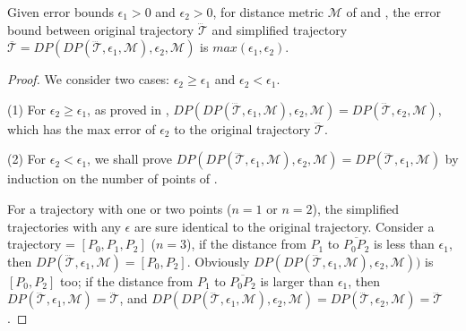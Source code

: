 \begin{proposition}
	\label{theo-aging-error-dp}
	Given error bounds $\epsilon_1>0$ and $\epsilon_2>0$, for distance metric $\mathcal{M}$ of \ped and \sed, the error bound between original trajectory $\dddot{\mathcal{T}}$ and simplified trajectory $\overline{\mathcal{T}}=DP(DP(\dddot{\mathcal{T}}, \epsilon_1, \mathcal{M}), \epsilon_2, \mathcal{M})$ is $max(\epsilon_1, \epsilon_2)$.
\end{proposition}

\begin{proof} We consider two cases: $\epsilon_2 \ge \epsilon_1$ and $\epsilon_2 < \epsilon_1$.

(1) For $\epsilon_2 \ge \epsilon_1$, as proved in \cite{Cao:Spatio}, $DP(DP(\dddot{\mathcal{T}}, \epsilon_1, \mathcal{M}), \epsilon_2, \mathcal{M}) = DP(\dddot{\mathcal{T}}, \epsilon_2, \mathcal{M})$, which has the max error of $\epsilon_2$ to the original trajectory $\dddot{\mathcal{T}}$.
	
(2) For $\epsilon_2 < \epsilon_1$, we shall prove $DP(DP(\dddot{\mathcal{T}}, \epsilon_1, \mathcal{M}), \epsilon_2, \mathcal{M}) = DP(\dddot{\mathcal{T}}, \epsilon_1, \mathcal{M})$ by  induction on the number of points of .
\bi	
	\item  For a trajectory  with one or two points ($n=1$ or $n=2$), the simplified trajectories with any $\epsilon$ are sure identical to the original trajectory.
	Consider a trajectory  =	$[P_0, P_1, P_2]$ ($n = 3$),
	if the distance from $P_1$ to $\overline{P_0P_2}$ is less than $\epsilon_1$, then $DP(\dddot{\mathcal{T}}, \epsilon_1, \mathcal{M}) = [P_0, P_2]$. Obviously $DP(DP(\dddot{\mathcal{T}}, \epsilon_1, \mathcal{M}), \epsilon_2, \mathcal{M}))$ is $[P_0, P_2]$ too;	
	if the distance from $P_1$ to $\overline{P_0P_2}$ is larger than $\epsilon_1$, then $DP(\dddot{\mathcal{T}}, \epsilon_1, \mathcal{M})=\dddot{\mathcal{T}}$, and $DP(DP(\dddot{\mathcal{T}}, \epsilon_1, \mathcal{M}), \epsilon_2, \mathcal{M}) = DP(\dddot{\mathcal{T}}, \epsilon_2, \mathcal{M})=\dddot{\mathcal{T}}$.
	

\end{proof}
